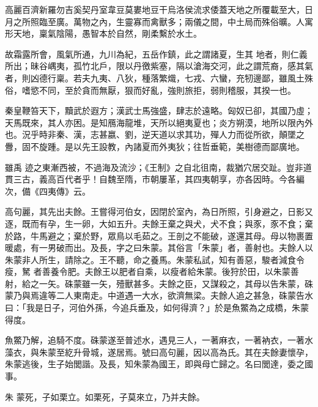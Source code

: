 
\begin{pinyinscope}

 高麗百濟新羅勿吉奚契丹室韋豆莫婁地豆干烏洛侯流求倭蓋天地之所覆載至大，日月之所照臨至廣。萬物之內，生靈寡而禽獸多；兩儀之間，中土局而殊俗曠。人寓形天地，稟氣陰陽，愚智本於自然，剛柔繫於水土。



 故霜露所會，風氣所通，九川為紀，五岳作鎮，此之謂諸夏，生其
 地者，則仁義所出；昧谷嵎夷，孤竹北戶，限以丹徼紫塞，隔以滄海交河，此之謂荒裔，感其氣者，則凶德行稟。若夫九夷、八狄，種落繁熾，七戎、六蠻，充牣邊鄙，雖風土殊俗，嗜慾不同，至於貪而無厭，狠而好亂，強則旅拒，弱則稽服，其揆一也。



 秦皇鞭笞天下，黷武於遐方；漢武士馬強盛，肆志於遠略。匈奴已卻，其國乃虛；天馬既來，其人亦困。是知鴈海龍堆，天所以絕夷夏也；炎方朔漠，地所以限內外也。況乎時非秦、漢，志甚嬴、劉，逆天道以求其功，殫人力而從所欲，顛墜之釁，固不旋踵。是以先王設教，內諸夏而外夷狄；往哲垂範，美樹德而鄙廣地。



 雖禹
 迹之東漸西被，不過海及流沙；《王制》之自北徂南，裁猶穴居交趾。豈非道貫三古，義高百代者乎！自魏至隋，市朝屢革，其四夷朝享，亦各因時。今各編次，備《四夷傳》云。



 高句麗，其先出夫餘。王嘗得河伯女，因閉於室內，為日所照，引身避之，日影又逐，既而有孕，生一卵，大如五升。夫餘王棄之與犬，犬不食；與豕，豕不食；棄於路，牛馬避之；棄於野，眾鳥以毛茹之。王剖之不能破，遂還其母。母以物裹置暖處，有一男破而出。及長，字之曰朱蒙。其俗言「朱蒙」者，善射也。夫餘人以朱蒙非人所生，請除之。王不聽，命之養馬。朱蒙私試，知有善惡，駿者減食令瘦，駑
 者善養令肥。夫餘王以肥者自乘，以瘦者給朱蒙。後狩於田，以朱蒙善射，給之一矢。硃蒙雖一矢，殪獸甚多。夫餘之臣，又謀殺之，其母以告朱蒙，硃蒙乃與焉違等二人東南走。中道遇一大水，欲濟無梁。夫餘人追之甚急，硃蒙告水曰：「我是日子，河伯外孫，今追兵垂及，如何得濟？」於是魚鱉為之成橋，朱蒙得度。



 魚鱉乃解，追騎不度。硃蒙遂至普述水，遇見三人，一著麻衣，一著衲衣，一著水藻衣，與朱蒙至紇升骨城，遂居焉。號曰高句麗，因以高為氏。其在夫餘妻懷孕，朱蒙逃後，生子始閭諧。及長，知朱蒙為國王，即與母亡歸之。名曰閭達，委之國事。



 朱
 蒙死，子如栗立。如栗死，子莫來立，乃并夫餘。




\end{pinyinscope}
